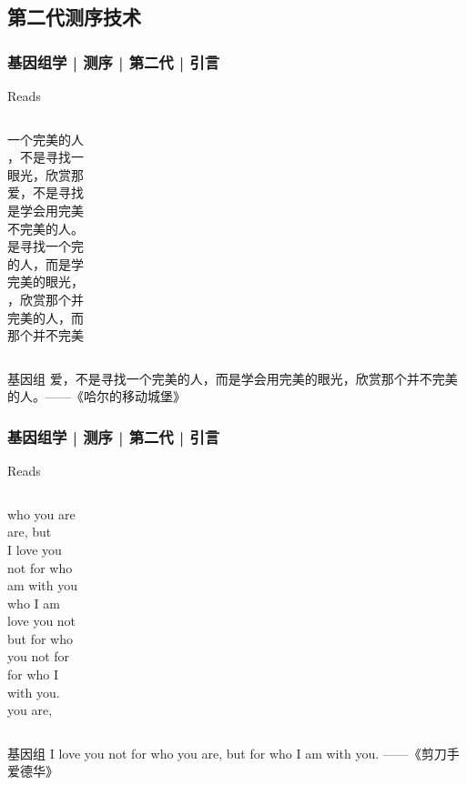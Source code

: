 \subsection{第二代测序技术}
\begin{frame}
  \frametitle{基因组学 | 测序 | 第二代 | 引言}
  \begin{block}{Reads}
    \begin{columns}
一个完美的人 \\ ，不是寻找一 \\ 眼光，欣赏那 \\ 爱，不是寻找 \\ 是学会用完美 \\  不完美的人。 \\
是寻找一个完 \\ 的人，而是学 \\ 完美的眼光， \\ ，欣赏那个并 \\ 完美的人，而 \\ 那个并不完美  \\
    \end{columns}
  \end{block}
  \pause
  \pause
  \pause
  \pause
  \begin{block}{基因组}
    爱，不是寻找一个完美的人，而是学会用完美的眼光，欣赏那个并不完美的人。——《哈尔的移动城堡》
  \end{block}
\end{frame}

\begin{frame}
  \frametitle{基因组学 | 测序 | 第二代 | 引言}
  \begin{block}{Reads}
    \begin{columns}
      who you are \\ are, but \\ I love you \\ not for who \\ am with you \\ who I am \\
      love you not \\ but for who \\ you not for \\ for who I \\ with you. \\ you are, \\
    \end{columns}
  \end{block}
  \pause
  \pause
  \pause
  \pause
  \begin{block}{基因组}
    I love you not for who you are, but for who I am with you. ——《剪刀手爱德华》
  \end{block}
\end{frame}

